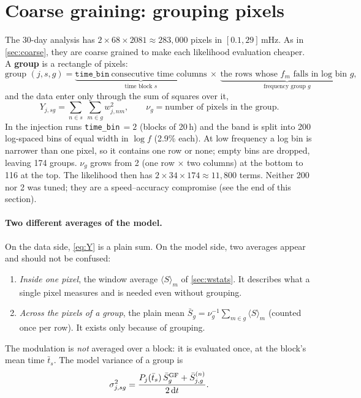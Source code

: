 \documentclass[11pt,a4paper]{article}
\newcommand{\dd}{\mathrm{d}}
\begin{document}
\section{Coarse graining: grouping pixels}\label{sec:wgroup}

The 30-day analysis has $2\times68\times2081\approx283{,}000$ pixels in
$[0.1,29]$\,mHz. As in \cref{sec:coarse}, they are coarse grained to make each
likelihood evaluation cheaper. A \textbf{group} is a rectangle of pixels:
\[
  \text{group }(j,s,g) = \underbrace{\texttt{time\_bin}\ \text{consecutive time
  columns}}_{\text{time block } s}\ \times\
  \underbrace{\text{the rows whose } f_m \text{ falls in log bin } g}_{\text{frequency group } g},
\]
and the data enter only through the sum of squares over it,
\begin{equation}
  Y_{j,sg} = \sum_{n\in s}\ \sum_{m\in g} w_{j,nm}^2,
  \qquad \nu_g = \text{number of pixels in the group}.
  \label{eq:Y}
\end{equation}
In the injection runs \texttt{time\_bin}$\,=2$ (blocks of 20\,h) and the band is split
into 200 log-spaced bins of equal width in $\log f$ (2.9\% each). At low frequency a log
bin is narrower than one pixel, so it contains one row or none; empty bins are
dropped, leaving 174 groups. $\nu_g$ grows from 2 (one row $\times$ two columns) at
the bottom to 116 at the top. The likelihood then has
$2\times34\times174\approx11{,}800$ terms. Neither 200 nor 2 was tuned; they are a
speed--accuracy compromise (see the end of this section).

\paragraph{Two different averages of the model.} On the data side, \cref{eq:Y} is a
plain sum. On the model side, two averages appear and should not be confused:
\begin{enumerate}
  \item \emph{Inside one pixel}, the window average $\langle S\rangle_m$ of
        \cref{sec:wstats}. It describes what a single pixel measures and is needed even
        without grouping.
  \item \emph{Across the pixels of a group}, the plain mean
        $\bar S_g = \nu_g^{-1}\sum_{m\in g}\langle S\rangle_m$ (counted once per row).
        It exists only because of grouping.
\end{enumerate}
The modulation is \emph{not} averaged over a block: it is evaluated once, at the
block's mean time $\bar t_s$. The model variance of a group is
\begin{equation}
  \sigma^2_{j,sg} = \frac{P_j(\bar t_s)\,\bar S^{\rm GF}_g + \bar S^{(n)}_{j,g}}{2\,\dd t}.
  \label{eq:siggroup}
\end{equation}
\end{document}
